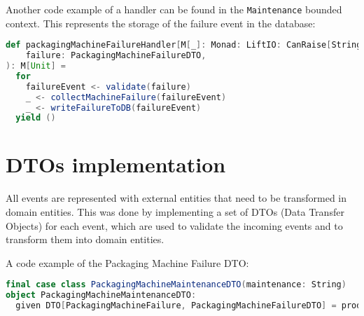 Another code example of a handler can be found in the \texttt{Maintenance} bounded context.
This represents the storage of the failure event in the database:

\begin{lstlisting}[language=Scala]
def packagingMachineFailureHandler[M[_]: Monad: LiftIO: CanRaise[String]](
    failure: PackagingMachineFailureDTO,
): M[Unit] =
  for
    failureEvent <- validate(failure)
    _ <- collectMachineFailure(failureEvent)
    _ <- writeFailureToDB(failureEvent)
  yield ()
\end{lstlisting}

\section{DTOs implementation}
All events are represented with external entities that need to be transformed in domain entities.
This was done by implementing a set of DTOs (Data Transfer Objects) for each event, which are used to validate the incoming events and to transform them into domain entities.

A code example of the Packaging Machine Failure DTO:

\begin{lstlisting}[language=Scala]
    final case class PackagingMachineMaintenanceDTO(maintenance: String)
object PackagingMachineMaintenanceDTO:
  given DTO[PackagingMachineFailure, PackagingMachineFailureDTO] = productTypeDTO

\end{lstlisting}